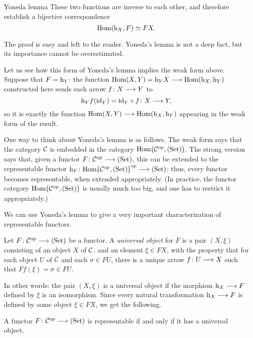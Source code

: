\begin{2   CONTRAVARIANT FUNCTORS}
\begin{2.1 Yoneda Lemma}
\begin{named}{Yoneda lemma}
These two functions are inverse to each other, and therefore establish a bijective correspondence
   \[
   \operatorname{Hom}(\mathrm{h}_X,F) \simeq F X.
   \]
\end{named}

The proof is easy and left to the reader. Yoneda's lemma is not a deep fact, but its importance cannot be overestimated.

Let us see how this form of Yoneda's lemma implies the weak form above. Suppose that $F = \mathrm{h}_Y$: the function $\hom(X,Y) = \h_Y X \arr \hom(\h_X,\h_Y)$ constructed here sends each arrow $f \colon X \arr Y$ to
   \[
   \h_Y f(\id_Y) = \id_Y \circ f \colon X \arr Y,
   \]
so it is exactly the function $\hom(X,Y) \arr \hom(\h_X,\h_Y)$ appearing in the weak form of the result.

One way to think about Yoneda's lemma is as follows. The weak form says that the category $\mathcal{C}$ is embedded in the category $\mathrm{Hom}\bigl(\mathcal{C}^{\mathrm{op}}, (\mathrm{Set})\bigr)$. The strong version says that, given a functor $F \colon \cC\op \arr \catset$, this can be extended to the representable functor $\h_F \colon \func{\cC}\op \arr \catset$: thus, every functor becomes representable, when extended appropriately. (In practice, the functor category $\mathrm{Hom}\bigl(\mathcal{C}^{\mathrm{op}}, (\mathrm{Set})\bigr)$ is usually much too big, and one has to restrict it appropriately.)

We can use Yoneda's lemma to give a very important characterization of representable functors.

\begin{definition} Let $F \colon \cC\op \arr \catset$ be a functor. A \emph{universal object} for $F$ is a pair $(X, \xi)$ consisting of an object $X$ of $\mathcal{C}$, and an element $\xi \in F X$, with the property that for each object $U$ of $\mathcal{C}$ and each $\sigma\in F U$, there is a unique arrow $f \colon U \arr X$ such that $F f(\xi) = \sigma \in F U$.
\end{definition}

In other words: the pair $(X, \xi)$ is a universal object if the morphism $\h_X \arr F$ defined by $\xi$ is an isomorphism. Since every natural transformation $\h_X \arr F$ is defined by some object $\xi \in F X$, we get the following.

\begin{proposition}
A functor $F \colon \cC\op \arr \catset$ is representable if and only if it has a universal object.
\end{proposition}


\end{2.1 Yoneda Lemma}
\end{2   CONTRAVARIANT FUNCTORS}
